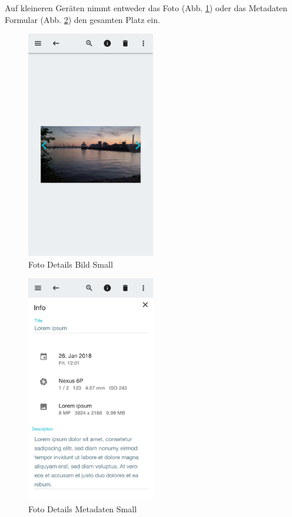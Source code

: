 Auf kleineren Geräten nimmt entweder das Foto (Abb. \ref{fig:details_small}) oder das Metadaten Formular (Abb. \ref{fig:form_small}) den gesamten Platz ein.

\begin{figure}[htp]     %
\centering
\includegraphics[width=0.5\textwidth]{images/details_small}
\caption{Foto Details Bild Small}\label{fig:details_small}
\end{figure}

\begin{figure}[htp]     %
\centering
\includegraphics[width=0.5\textwidth]{images/form_small}
\caption{Foto Details Metadaten Small}\label{fig:form_small}
\end{figure}

